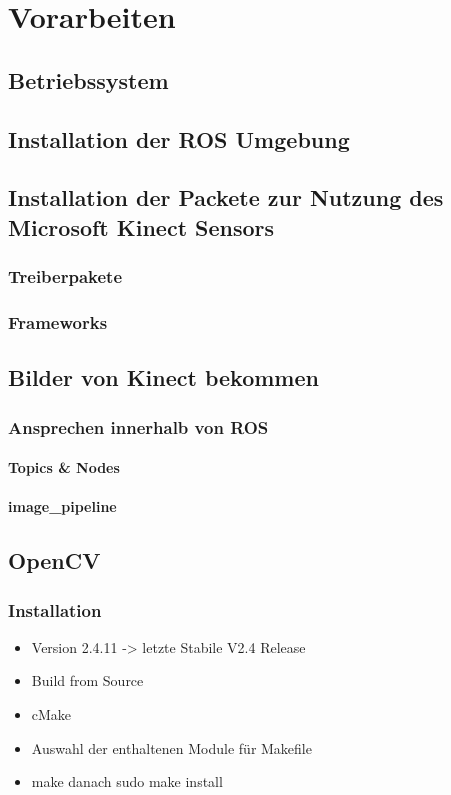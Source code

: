 \chapter{Vorarbeiten}
	\section{Betriebssystem}
	\section{Installation der ROS Umgebung}
	\section{Installation der Packete zur Nutzung des Microsoft Kinect Sensors}
		\subsection{Treiberpakete}
		\subsection{Frameworks}
	\section{Bilder von Kinect bekommen}
		\subsection{Ansprechen innerhalb von ROS}
			\subsubsection{Topics \& Nodes}
			\subsubsection{image\_pipeline}
	\section{OpenCV}
		\subsection{Installation}
			\begin{itemize}
			\item Version 2.4.11 -> letzte Stabile V2.4 Release
			\item Build from Source
			\item cMake
			\item Auswahl der enthaltenen Module für Makefile
			\item make danach sudo make install
			\end{itemize}
